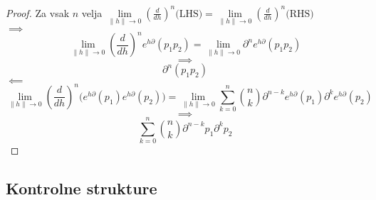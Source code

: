 \documentclass{article}
\newcommand{\dP}{\mathcal{P}}
\newcommand{\D}{\partial}
\newtheorem{izrek}{Izrek}[section]
\begin{document}
 \begin{proof}
 Za vsak $n$ velja $\lim\limits_{\lVert h\rVert\to 0}(\frac{d}{dh})^n\text{(LHS)}=\lim\limits_{\lVert h\rVert\to 0}(\frac{d}{dh})^n\text{(RHS)}$\\
  $\implies$
  $$\lim\limits_{\lVert h\rVert\to 0}(\frac{d}{dh})^ne^{h\D}(p_1p_2)=\lim\limits_{\lVert h\rVert\to 0}\D^ne^{h\D}(p_1p_2)$$
  $$\implies$$
  $$\D^n(p_1p_2)$$
  $\impliedby$
  $$\lim\limits_{\lVert h\rVert\to 0}(\frac{d}{dh})^n\Big(e^{h\D}(p_1)e^{h\D}(p_2)\Big)=\lim\limits_{\lVert h\rVert\to 0}\sum\limits_{k=0}^{n}{n\choose k}\D^{n-k}e^{h\D}(p_1)\D^ke^{h\D}(p_2)$$
  $$\implies$$
  $$\sum\limits_{k=0}^{n}{n\choose k}\D^{n-k}p_1\D^kp_2$$
 \end{proof}
 
% 
% 
 \subsection{Kontrolne strukture}
 
\end{document}
